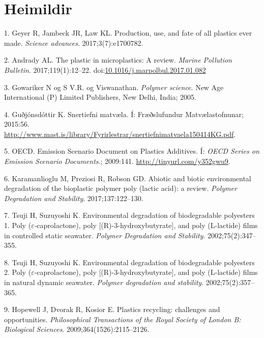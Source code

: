 \documentclass[icelandic,]{book}
\begin{document}
\hypertarget{heimildir}{%
\chapter*{Heimildir}\label{heimildir}}

\hypertarget{refs}{}
\leavevmode\hypertarget{ref-geyer2017production}{}%
1. Geyer R, Jambeck JR, Law KL. Production, use, and fate of all plastics ever made. \emph{Science advances}. 2017;3(7):e1700782.

\leavevmode\hypertarget{ref-Andrady2017}{}%
2. Andrady AL. The plastic in microplastics: A review. \emph{Marine Pollution Bulletin}. 2017;119(1):12--22. doi:\href{https://doi.org/10.1016/j.marpolbul.2017.01.082}{10.1016/j.marpolbul.2017.01.082}

\leavevmode\hypertarget{ref-Gowariker2005}{}%
3. Gowariker N og S V.R. og Viswanathan. \emph{Polymer science}. New Age International (P) Limited Publishers, New Delhi, India; 2005.

\leavevmode\hypertarget{ref-Gudjonsdottir2015}{}%
4. Guðjónsdóttir K. Snertiefni matvæla. Í: Fræðslufundur Matvælastofnunar; 2015:56. \url{http://www.mast.is/library/Fyrirlestrar/snertiefnimatvaela150414KG.pdf}.

\leavevmode\hypertarget{ref-OECD2009}{}%
5. OECD. Emission Scenario Document on Plastics Additives. Í: \emph{OECD Series on Emission Scenario Documents}.; 2009:141. \url{http://tinyurl.com/y352gwu9}.

\leavevmode\hypertarget{ref-karamanlioglu2017abiotic}{}%
6. Karamanlioglu M, Preziosi R, Robson GD. Abiotic and biotic environmental degradation of the bioplastic polymer poly (lactic acid): a review. \emph{Polymer Degradation and Stability}. 2017;137:122--130.

\leavevmode\hypertarget{ref-tsuji2002environmental-1}{}%
7. Tsuji H, Suzuyoshi K. Environmental degradation of biodegradable polyesters 1. Poly (\(\varepsilon\)-caprolactone), poly {[}(R)-3-hydroxybutyrate{]}, and poly (L-lactide) films in controlled static seawater. \emph{Polymer Degradation and Stability}. 2002;75(2):347--355.

\leavevmode\hypertarget{ref-tsuji2002environmental-2}{}%
8. Tsuji H, Suzuyoshi K. Environmental degradation of biodegradable polyesters 2. Poly (\(\varepsilon\)-caprolactone), poly {[}(R)-3-hydroxybutyrate{]}, and poly (L-lactide) films in natural dynamic seawater. \emph{Polymer degradation and stability}. 2002;75(2):357--365.

\leavevmode\hypertarget{ref-hopewell2009plastics}{}%
9. Hopewell J, Dvorak R, Kosior E. Plastics recycling: challenges and opportunities. \emph{Philosophical Transactions of the Royal Society of London B: Biological Sciences}. 2009;364(1526):2115--2126.
\end{document}
